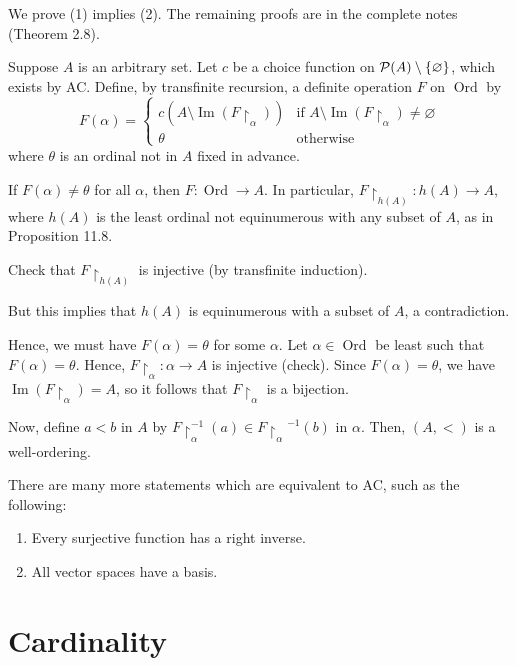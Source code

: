 \documentclass[10pt]{article}
\makeatletter
\DeclareMathOperator{\im}{Im}
\DeclareMathOperator{\Ord}{Ord}
\theoremstyle{newstyle}
\newenvironment{pf}[1][\proofname]{\par
  \pushQED{\qed}%
  \normalfont \topsep0\p@\relax
  \trivlist
  \item[\hskip\labelsep\scshape
  #1\@addpunct{.}]\ignorespaces
}{%
  \popQED\endtrivlist\@endpefalse
}
\makeatother
\begin{document}
\begin{pf} 
We prove (1) implies (2). The remaining proofs are in the complete notes (Theorem 2.8). 

Suppose $A$ is an arbitrary set. Let $c$ be a choice function on 
${\cal P}(A) \setminus \{\varnothing\}$, which exists by AC. Define, by transfinite recursion, a 
definite operation $F$ on $\Ord$ by 
\[ F(\alpha) = \begin{cases} c(A \setminus \im(F \upharpoonright_\alpha)) & \text{if } A 
\setminus \im(F \upharpoonright_\alpha) \neq \varnothing \\ \theta & \text{otherwise} \end{cases} \]
where $\theta$ is an ordinal not in $A$ fixed in advance. 

If $F(\alpha) \neq \theta$ for all $\alpha$, then $F : \Ord \to A$. In particular, 
$F \upharpoonright_{h(A)} : h(A) \to A$, where $h(A)$ is the least ordinal not equinumerous 
with any subset of $A$, as in Proposition 11.8. 

Check that $F \upharpoonright_{h(A)}$ is injective (by transfinite induction). 

But this implies that $h(A)$ is equinumerous with a subset of $A$, a contradiction. 

Hence, we must have $F(\alpha) = \theta$ for some $\alpha$. Let $\alpha \in \Ord$ 
be least such that $F(\alpha) = \theta$. Hence, $F \upharpoonright_\alpha : \alpha \to A$ 
is injective (check). Since $F(\alpha) = \theta$, we have $\im(F \upharpoonright_\alpha) = A$, 
so it follows that $F \upharpoonright_\alpha$ is a bijection. 

Now, define $a < b$ in $A$ by $F \upharpoonright_\alpha^{-1}(a) \in 
{F \upharpoonright_\alpha}^{-1}(b)$ in $\alpha$. Then, $(A, <)$ is a well-ordering.
\end{pf}

There are many more statements which are equivalent to AC, such as the following: 
\begin{enumerate}[(1)]
    \item Every surjective function has a right inverse.
    \item All vector spaces have a basis. 
\end{enumerate}

 
\newpage\section{Cardinality}
\end{document}
